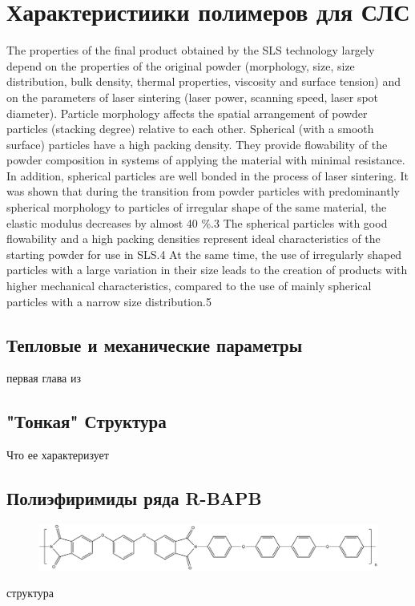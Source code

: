 \section{Характеристиики полимеров для СЛС}

The properties of the final product obtained by the SLS technology largely depend on the properties of the original powder (morphology, size, size distribution, bulk density, thermal properties, viscosity and surface tension) and on the parameters of laser sintering (laser power, scanning speed, laser spot diameter). Particle morphology affects the spatial arrangement of powder particles (stacking degree) relative to each other. Spherical (with a smooth surface) particles have a high packing density. They provide flowability of the powder composition in systems of applying the material with minimal resistance. In addition, spherical particles are well bonded in the process of laser sintering. It was shown that during the transition from powder particles with predominantly spherical morphology to particles of irregular shape of the same material, the elastic modulus decreases by almost 40 \%.3 The spherical particles with good flowability and a high packing densities represent ideal characteristics of the starting powder for use in SLS.4 At the same time, the use of irregularly shaped particles with a large variation in their size leads to the creation of products with higher mechanical characteristics, compared to the use of mainly spherical particles with a narrow size distribution.5

\subsection{Тепловые и механические параметры}
первая глава из
\cite{termopols}


\subsection{"Тонкая" Структура}
Что ее характеризует


\subsection{Полиэфиримиды ряда R-BAPB }
		
	\begin{figure}[h]
	\includegraphics[width=\textwidth]{fig/formula.png}
	\end{figure}
	структура

